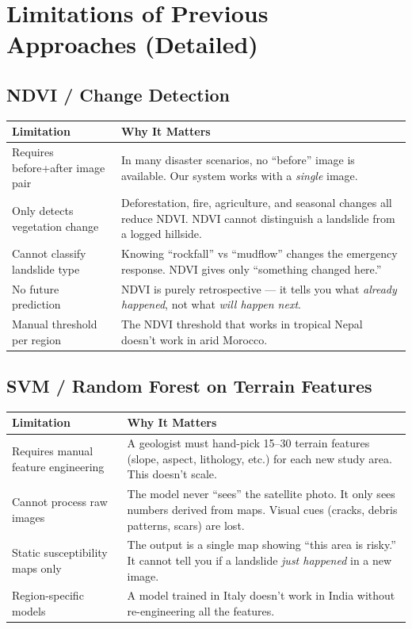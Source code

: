 \documentclass[11pt]{article}
\begin{document}
\newpage
\section{Limitations of Previous Approaches (Detailed)}

\subsection{NDVI / Change Detection}
\begin{table}[H]
\centering
\begin{tabular}{@{}p{5.5cm}p{7.5cm}@{}}
\toprule
\textbf{Limitation} & \textbf{Why It Matters} \\
\midrule
Requires before+after image pair & In many disaster scenarios, no ``before'' image is available. Our system works with a \emph{single} image. \\
Only detects vegetation change & Deforestation, fire, agriculture, and seasonal changes all reduce NDVI. NDVI cannot distinguish a landslide from a logged hillside. \\
Cannot classify landslide type & Knowing ``rockfall'' vs ``mudflow'' changes the emergency response. NDVI gives only ``something changed here.'' \\
No future prediction & NDVI is purely retrospective --- it tells you what \emph{already happened}, not what \emph{will happen next}. \\
Manual threshold per region & The NDVI threshold that works in tropical Nepal doesn't work in arid Morocco. \\
\bottomrule
\end{tabular}
\end{table}

\subsection{SVM / Random Forest on Terrain Features}
\begin{table}[H]
\centering
\begin{tabular}{@{}p{5.5cm}p{7.5cm}@{}}
\toprule
\textbf{Limitation} & \textbf{Why It Matters} \\
\midrule
Requires manual feature engineering & A geologist must hand-pick 15--30 terrain features (slope, aspect, lithology, etc.) for each new study area. This doesn't scale. \\
Cannot process raw images & The model never ``sees'' the satellite photo. It only sees numbers derived from maps. Visual cues (cracks, debris patterns, scars) are lost. \\
Static susceptibility maps only & The output is a single map showing ``this area is risky.'' It cannot tell you if a landslide \emph{just happened} in a new image. \\
Region-specific models & A model trained in Italy doesn't work in India without re-engineering all the features. \\
\bottomrule
\end{tabular}
\end{table}
\end{document}
